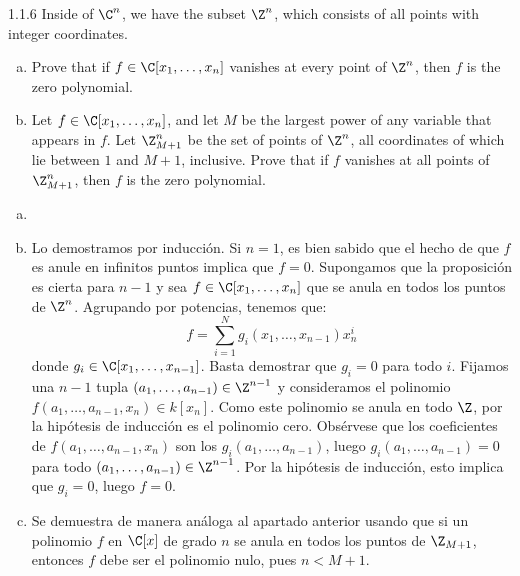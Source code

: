 \documentclass[twoside]{article}
\begin{document}
\begin{ejercicio}{1.1.6}
Inside of $\C^n$, we have the subset $\Z^n$, which consists of all points with integer coordinates.
\begin{enumerate}[a.]
\item Prove that if $f \in \C[x_1,\dots,x_n]$ vanishes at every point of $\Z^n$, then $f$ is the zero polynomial.
\item Let $f \in \C[x_1,\dots,x_n]$, and let $M$ be the largest power of any variable that appears in $f$.
Let $\Z_{M+1}^n$ be the set of points of $\Z^n$, all coordinates of which lie between $1$ and $M+1$, inclusive.
Prove that if $f$ vanishes at all points of $\Z_{M+1}^n$, then $f$ is the zero polynomial.
\end{enumerate}
\end{ejercicio}
\begin{solucion}
\begin{enumerate}[a.]
\item[]
\item Lo demostramos por inducción.
Si $n=1$, es bien sabido que el hecho de que $f$ es anule en infinitos puntos implica que $f=0$.
Supongamos que la proposición es cierta para $n-1$ y sea $f \in \C[x_1,\dots,x_n]$ que se anula en todos los puntos de $\Z^n$.
Agrupando por potencias, tenemos que:
\[ f = \sum_{i=1}^N g_i(x_1,\dots,x_{n-1})x_n^i \]
donde $g_i \in \C[x_1,\dots,x_{n-1}]$.
Basta demostrar que $g_i = 0$ para todo $i$.
Fijamos una $n-1$ tupla $(a_1,\dots,a_{n-1}) \in \Z^{n-1}$ y consideramos el polinomio $f(a_1,\dots,a_{n-1},x_n) \in k[x_n]$.
Como este polinomio se anula en todo $\Z$, por la hipótesis de inducción es el polinomio cero.
Obsérvese que los coeficientes de $f(a_1,\dots,a_{n-1},x_n)$ son los $g_i(a_1,\dots,a_{n-1})$, luego $g_i(a_1,\dots,a_{n-1})=0$ para todo $(a_1,\dots,a_{n-1})\in\Z^{n-1}$. 
Por la hipótesis de inducción, esto implica que $g_i = 0$, luego $f = 0$.

\item Se demuestra de manera análoga al apartado anterior usando que si un polinomio $f$ en $\C[x]$ de grado $n$ se anula en todos los puntos de $\Z_{M+1}$, entonces $f$ debe ser el polinomio nulo, pues $n < M+1$.
\end{enumerate}
\end{solucion}
\end{document}
